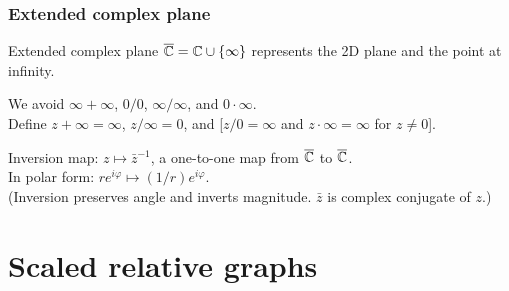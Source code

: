 \documentclass[10pt,mathserif]{beamer}
\begin{document}
\begin{frame}
\frametitle{Extended complex plane}
Extended complex plane $\overline{\mathbb{C}}=\mathbb{C}\cup\{\infty\}$ represents the 2D plane and the point at infinity.

\vspace{0.2in}

We avoid $\infty+\infty$, $0/0$, $\infty/\infty$, and $0\cdot\infty$.\\
Define $z+\infty=\infty$, $z/\infty=0$, and [$z/0=\infty$ and $z\cdot\infty=\infty$ for $z\ne 0$].

\vspace{0.2in}

Inversion map: $z\mapsto\bar{z}^{-1}$, a one-to-one map from $\overline{\mathbb{C}}$ to $\overline{\mathbb{C}}$. \\
In polar form: $re^{i\varphi}\mapsto (1/r)e^{i\varphi}$.\\


\vspace{0.2in}
(Inversion preserves angle and inverts magnitude. $\bar{z}$ is complex conjugate of $z$.)

\end{frame}



\section{Scaled relative graphs}
\end{document}
